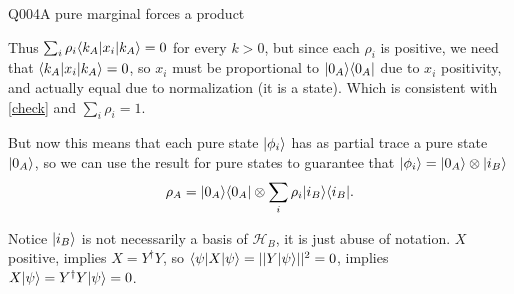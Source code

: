 \begin{entry}{Q004}{A pure marginal forces a product}
\begin{solution}
Thus $\sum_i \rho_i \langle k_A \rvert x_i\lvert k_A \rangle=0$
for every $k>0$, but since each $\rho_i$ is positive, we need that $\langle k_A \rvert x_i\lvert k_A \rangle=0$, so
$x_i$ must be proportional to $\lvert 0_A \rangle\langle 0_A \rvert$ due to $x_i$ positivity, and actually equal due to normalization (it is a state). Which is consistent with \eqref{check} and $\sum_i \rho_i=1$.

But now this means that each pure state $\lvert \phi_i \rangle$ has as partial trace a pure state $\lvert 0_A \rangle$, so we can use the result for pure states to guarantee that $\lvert \phi_i \rangle=\lvert 0_A \rangle \otimes \lvert i_B \rangle$
$$\rho_A= \lvert 0_A \rangle\langle 0_A \rvert \otimes \sum_i \rho_i \lvert i_B \rangle\langle i_B \rvert.$$

Notice $\lvert i_B \rangle$ is not necessarily a basis of $\mathcal H_B$, it is just abuse of notation.
$X$ positive, implies $X=Y^\dagger Y$, so $\langle \psi \rvert X\lvert \psi \rangle=||Y\lvert \psi \rangle||^2=0$, implies $X\lvert \psi \rangle=Y^\dagger Y\lvert \psi \rangle=0$.
\end{solution}

\begin{takeaway}

\end{takeaway}


\end{entry}
